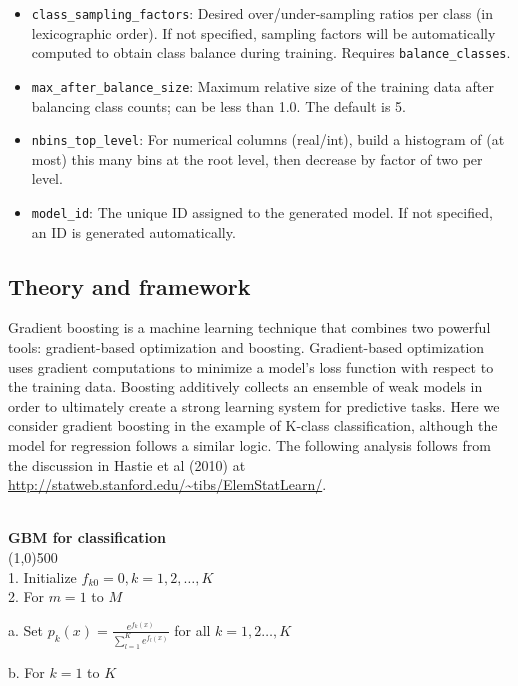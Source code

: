 \begin{itemize}
\item {\texttt{class\_sampling\_factors}}: Desired over/under-sampling ratios per class (in lexicographic order). If not specified, sampling factors will be automatically computed to obtain class balance during training. Requires \texttt{balance\_classes}.
\item {\texttt{max\_after\_balance\_size}}: Maximum relative size of the training data after balancing class counts; can be less than 1.0.  The default is 5.
\item {\texttt{nbins\_top\_level}}: For numerical columns (real/int), build a histogram of (at most) this many bins at the root level, then decrease by factor of two per level.
\item \texttt{model\_id}: The unique ID assigned to the generated model. If not specified, an ID is generated automatically.
\end{itemize}



\subsection{Theory and framework}

Gradient boosting is a machine learning technique that combines two powerful tools: gradient-based optimization and
boosting. Gradient-based optimization uses gradient computations to minimize a model's loss function with respect to
the training data. Boosting additively collects an ensemble of weak models in order to ultimately create a strong
learning system for predictive tasks. Here we consider gradient boosting in the example of K-class classification,
although the model for regression follows a similar logic. The following analysis follows from the discussion in
Hastie et al (2010) at {\url{http://statweb.stanford.edu/~tibs/ElemStatLearn/}}.

\newline
\\
{\bf{\footnotesize{GBM for classification}}}
\\
\line(1,0){500}
\\
1. Initialize $f_{k0} = 0, k = 1,2,\dots,K$
\\
2. For $m=1$ to $M$

\hspace{1cm} a. Set $p_k(x) = \frac{e^{f_k(x)}}{\sum_{l=1}^K e^{f_l(x)}}$ for all $k = 1,2\dots, K$

\hspace{1cm} b. For $k=1$ to $K$

